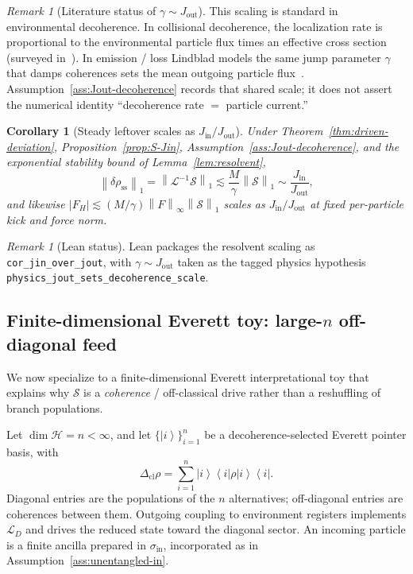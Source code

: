 \documentclass[11pt]{article}
\newtheorem{corollary}[theorem]{Corollary}
\theoremstyle{definition}
\theoremstyle{remark}
\newtheorem{remark}[theorem]{Remark}
\newcommand{\ket}[1]{\left|#1\right\rangle}
\newcommand{\bra}[1]{\left\langle#1\right|}
\newcommand{\norm}[1]{\left\lVert #1\right\rVert}
\begin{document}
\begin{remark}[Literature status of $\gamma\sim J_{\mathrm{out}}$]
\label{rem:lit-jout}
This scaling is standard in environmental decoherence.
In collisional decoherence, the localization rate is proportional to the environmental particle flux times an effective cross section~\cite{joosZeh1985,gallisFleming1990,hornbergerSipe2003} (surveyed in~\cite{schlosshauer2007}).
In emission / loss Lindblad models the same jump parameter $\gamma$ that damps coherences sets the mean outgoing particle flux~\cite{breuerPetruccione2002,gardinerZoller2004}.
Assumption~\ref{ass:Jout-decoherence} records that shared scale; it does not assert the numerical identity ``decoherence rate $=$ particle current.''
\end{remark}

\begin{corollary}[Steady leftover scales as $J_{\mathrm{in}}/J_{\mathrm{out}}$]
\label{cor:jin-over-jout}
Under Theorem~\ref{thm:driven-deviation}, Proposition~\ref{prop:S-Jin}, Assumption~\ref{ass:Jout-decoherence}, and the exponential stability bound of Lemma~\ref{lem:resolvent},
\begin{equation}
  \norm{\delta\rho_{\mathrm{ss}}}_1
  =\norm{\mathcal L^{-1}\mathcal S}_1
  \lesssim\frac{M}{\gamma}\norm{\mathcal S}_1
  \sim\frac{J_{\mathrm{in}}}{J_{\mathrm{out}}},
\end{equation}
and likewise $|F_H|\lesssim (M/\gamma)\norm{F}_\infty\norm{\mathcal S}_1$ scales as $J_{\mathrm{in}}/J_{\mathrm{out}}$ at fixed per-particle kick and force norm.
\end{corollary}

\begin{remark}[Lean status]
Lean packages the resolvent scaling as \texttt{cor\_jin\_over\_jout}, with $\gamma\sim J_{\mathrm{out}}$ taken as the tagged physics hypothesis \texttt{physics\_jout\_sets\_decoherence\_scale}.
\end{remark}

\subsection{Finite-dimensional Everett toy: large-$n$ off-diagonal feed}
\label{sec:everett-toy}
We now specialize to a finite-dimensional Everett interpretational toy that explains why $\mathcal S$ is a \emph{coherence} / off-classical drive rather than a reshuffling of branch populations.

Let $\dim\mathcal H=n<\infty$, and let $\{\ket{i}\}_{i=1}^n$ be a decoherence-selected Everett pointer basis, with
\begin{equation}
  \Delta_{\mathrm{cl}}\rho=\sum_{i=1}^n\ket{i}\bra{i}\rho\ket{i}\bra{i}.
\end{equation}
Diagonal entries are the populations of the $n$ alternatives; off-diagonal entries are coherences between them.
Outgoing coupling to environment registers implements $\mathcal L_D$ and drives the reduced state toward the diagonal sector.
An incoming particle is a finite ancilla prepared in $\sigma_{\mathrm{in}}$, incorporated as in Assumption~\ref{ass:unentangled-in}.
\end{document}

